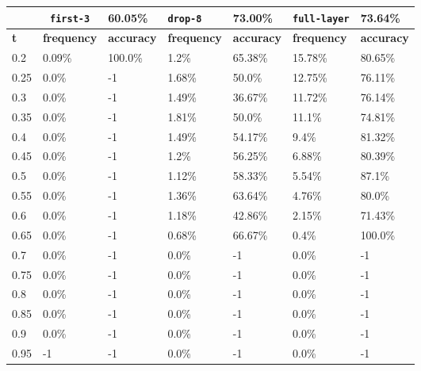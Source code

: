 
\begin{table}[t]
\centering
\begin{tabular}{lllllll} %
\hline

\multicolumn{1}{c}{}& 
\multicolumn{1}{c}{\texttt{first-3}} & \multicolumn{1}{l|}{60.05\%} 
& \multicolumn{1}{l}{\texttt{drop-8}} & \multicolumn{1}{l|}{73.00\%}
& \multicolumn{1}{l}{\texttt{full-layer}} & 73.64\%
\\ \hline
\multicolumn{1}{l|}{\textbf{t}} &
\multicolumn{1}{l|}{\textbf{frequency}} & 
\multicolumn{1}{l|}{\textbf{accuracy}} & 
\multicolumn{1}{l|}{\textbf{frequency}} & 
\multicolumn{1}{l|}{\textbf{accuracy}} & 
\multicolumn{1}{l|}{\textbf{frequency}} & 
\multicolumn{1}{l|}{\textbf{accuracy}} \\ \hline
	\multicolumn{1}{l|}{0.2}&  0.09\% & \multicolumn{1}{l|}{100.0\%}& 1.2\% & \multicolumn{1}{l|}{65.38\%}& 15.78\% & 80.65\%\\ 
\multicolumn{1}{l|}{0.25}&  0.0\% & \multicolumn{1}{l|}{-1}& 1.68\% & \multicolumn{1}{l|}{50.0\%}& 12.75\% & 76.11\%\\ 
\multicolumn{1}{l|}{0.3}&  0.0\% & \multicolumn{1}{l|}{-1}& 1.49\% & \multicolumn{1}{l|}{36.67\%}& 11.72\% & 76.14\%\\ 
\multicolumn{1}{l|}{0.35}&  0.0\% & \multicolumn{1}{l|}{-1}& 1.81\% & \multicolumn{1}{l|}{50.0\%}& 11.1\% & 74.81\%\\ 
\multicolumn{1}{l|}{0.4}&  0.0\% & \multicolumn{1}{l|}{-1}& 1.49\% & \multicolumn{1}{l|}{54.17\%}& 9.4\% & 81.32\%\\ 
\multicolumn{1}{l|}{0.45}&  0.0\% & \multicolumn{1}{l|}{-1}& 1.2\% & \multicolumn{1}{l|}{56.25\%}& 6.88\% & 80.39\%\\ 
\multicolumn{1}{l|}{0.5}&  0.0\% & \multicolumn{1}{l|}{-1}& 1.12\% & \multicolumn{1}{l|}{58.33\%}& 5.54\% & 87.1\%\\ 
\multicolumn{1}{l|}{0.55}&  0.0\% & \multicolumn{1}{l|}{-1}& 1.36\% & \multicolumn{1}{l|}{63.64\%}& 4.76\% & 80.0\%\\ 
\multicolumn{1}{l|}{0.6}&  0.0\% & \multicolumn{1}{l|}{-1}& 1.18\% & \multicolumn{1}{l|}{42.86\%}& 2.15\% & 71.43\%\\ 
\multicolumn{1}{l|}{0.65}&  0.0\% & \multicolumn{1}{l|}{-1}& 0.68\% & \multicolumn{1}{l|}{66.67\%}& 0.4\% & 100.0\%\\ 
\multicolumn{1}{l|}{0.7}&  0.0\% & \multicolumn{1}{l|}{-1}& 0.0\% & \multicolumn{1}{l|}{-1}& 0.0\% & -1\\ 
\multicolumn{1}{l|}{0.75}&  0.0\% & \multicolumn{1}{l|}{-1}& 0.0\% & \multicolumn{1}{l|}{-1}& 0.0\% & -1\\ 
\multicolumn{1}{l|}{0.8}&  0.0\% & \multicolumn{1}{l|}{-1}& 0.0\% & \multicolumn{1}{l|}{-1}& 0.0\% & -1\\ 
\multicolumn{1}{l|}{0.85}&  0.0\% & \multicolumn{1}{l|}{-1}& 0.0\% & \multicolumn{1}{l|}{-1}& 0.0\% & -1\\ 
\multicolumn{1}{l|}{0.9}&  0.0\% & \multicolumn{1}{l|}{-1}& 0.0\% & \multicolumn{1}{l|}{-1}& 0.0\% & -1\\ 
\multicolumn{1}{l|}{0.95}&  -1 & \multicolumn{1}{l|}{-1}& 0.0\% & \multicolumn{1}{l|}{-1}& 0.0\% & -1\\ 


\end{tabular}
\end{table}
